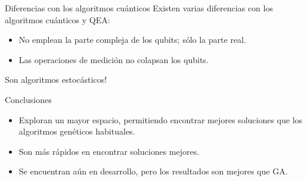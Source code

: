 \documentclass{beamer}
\begin{document}
\begin{frame}{Diferencias con los algoritmos cuánticos}
Existen varias diferencias con los algoritmos cuánticos y QEA:
\begin{itemize}
	\item No emplean la parte compleja de los qubits; sólo la parte real.
	\item Las operaciones de medición no colapsan los qubits.
\end{itemize}
Son algoritmos estocásticos!

\end{frame}
\begin{frame}{Conclusiones}
\begin{itemize}
\item Exploran un mayor espacio, permitiendo encontrar mejores soluciones que 
los algoritmos genéticos habituales.

\item Son más rápidos en encontrar soluciones mejores.

\item Se encuentran aún en desarrollo, pero los resultados son mejores que GA.
\end{itemize}
\end{frame}
\end{document}
